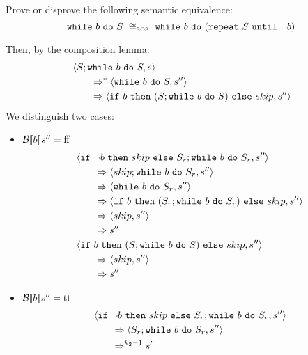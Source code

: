 \begin{exercise}{
    Prove or disprove the following semantic equivalence:
    \[ \wwhile{b}{S}\ \SOScong\ \wwhile{b}{(\wrepeat{S}{\neg b})}  \]
}
\begin{itemize}
\begin{itemize}
\begin{itemize}
                        Then, by the composition lemma:
                        \begin{align*}
                            &\left<S; \texttt{while}\ b\ \texttt{do}\ S, s\right>
                            \\&\qquad\Rightarrow^* \left<\texttt{while}\ b\ \texttt{do}\ S, s''\right>
                            \\&\qquad\Rightarrow \left<\texttt{if}\ b\ \texttt{then}\ (S; \texttt{while}\ b\ \texttt{do}\ S)\ \texttt{else}\ skip, s''\right>
                        \end{align*}
                        We distinguish two cases:
                        \begin{itemize}
                            \item $\mathcal{B} \llbracket b \rrbracket s'' = \text{ff}$
                                \begin{align*}
                                    &\left<\texttt{if}\ \neg b\ \texttt{then}\ skip\ \texttt{else}\ S_r; \texttt{while}\ b\ \texttt{do}\ S_r, s''\right>
                                    \\&\qquad\Rightarrow \left<skip; \texttt{while}\ b\ \texttt{do}\ S_r, s''\right>
                                    \\&\qquad\Rightarrow \left<\texttt{while}\ b\ \texttt{do}\ S_r, s''\right>
                                    \\&\qquad\Rightarrow \left<\texttt{if}\ b\ \texttt{then}\ (S_r; \texttt{while}\ b\ \texttt{do}\ S_r)\ \texttt{else}\ skip, s''\right>
                                    \\&\qquad\Rightarrow \left<skip, s''\right>
                                    \\&\qquad\Rightarrow s''
                                    \\
                                    &\left<\texttt{if}\ b\ \texttt{then}\ (S; \texttt{while}\ b\ \texttt{do}\ S)\ \texttt{else}\ skip, s''\right>
                                    \\&\qquad\Rightarrow \left<skip, s''\right>
                                    \\&\qquad\Rightarrow s''
                                \end{align*}
                            \item $\mathcal{B} \llbracket b \rrbracket s'' = \text{tt}$
                                \begin{align*}
                                    &\instr{\wif{\neg b}{skip}{S_r}; \wwhile{b}{S_r}}{s''}
                                    \\&\qquad\Rightarrow \instr{S_r; \wwhile{b}{S_r}}{s''}
                                    \\&\qquad\Rightarrow^{k_2 - 1} s'
                                    \\

\end{align*}
\end{itemize}
\end{itemize}
\end{itemize}
\end{itemize}
\end{exercise}
